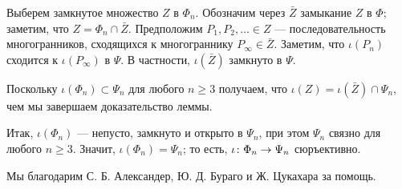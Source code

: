 \documentclass[oneside,a4paper]{article}
\begin{document}
Выберем замкнутое множество $Z$ в $\Phi_n$.
Обозначим через $\bar Z$ замыкание $Z$ в $\Phi$; заметим, что $Z=\Phi_n\cap \bar Z$.
Предположим $P_1,P_2,\dots\in Z$ --- последовательность многогранников, сходящихся к многограннику $P_\infty\in\bar Z$.
Заметим, что $\iota(P_n)$ сходится к $\iota(P_\infty)$  в $\Psi$.
В частности, $\iota(\bar Z)$ замкнуто в $\Psi$.

Поскольку $\iota(\Phi_n)\subset \Psi_n$ для любого $n\ge 3$ получаем, что  $\iota (Z)=\iota(\bar Z)\cap \Psi_n$, чем мы завершаем доказательство леммы. 

\medskip

Итак, $\iota(\Phi_n)$ --- непусто, замкнуто и открыто в $\Psi_n$, при этом $\Psi_n$ связно для любого $n\ge 3$.
Значит, $\iota(\Phi_n)=\Psi_n$; то есть, $\iota\:\Phi_n\z\to\Psi_n$ сюръективно.
\qeds

 Мы благодарим С. Б. Александер, Ю. Д. Бураго и Ж. Цукахара за помощь. 

\sloppy
\printbibliography[heading=bibintoc]
\fussy
\end{document}
